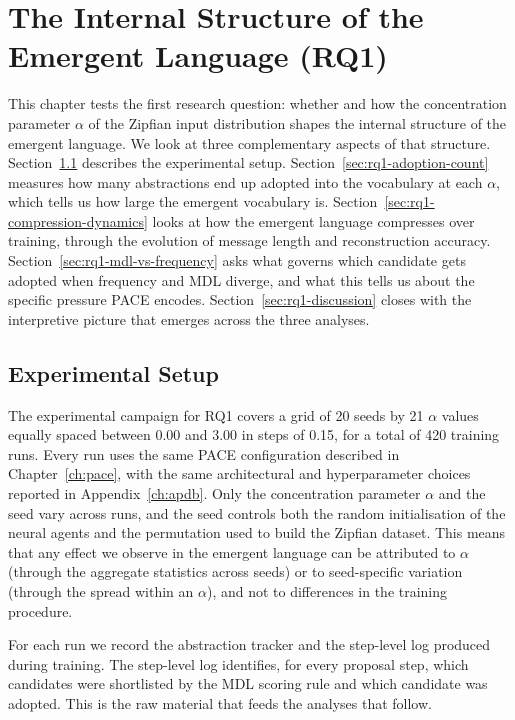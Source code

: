 \chapter{The Internal Structure of the Emergent Language (RQ1)}
\label{ch:experimental}

This chapter tests the first research question: whether and how the concentration parameter $\alpha$ of the Zipfian input distribution shapes the internal structure of the emergent language. We look at three complementary aspects of that structure. Section~\ref{sec:rq1-setup} describes the experimental setup. Section~\ref{sec:rq1-adoption-count} measures how many abstractions end up adopted into the vocabulary at each $\alpha$, which tells us how large the emergent vocabulary is. Section~\ref{sec:rq1-compression-dynamics} looks at how the emergent language compresses over training, through the evolution of message length and reconstruction accuracy. Section~\ref{sec:rq1-mdl-vs-frequency} asks what governs which candidate gets adopted when frequency and MDL diverge, and what this tells us about the specific pressure PACE encodes. Section~\ref{sec:rq1-discussion} closes with the interpretive picture that emerges across the three analyses.

\section{Experimental Setup}
\label{sec:rq1-setup}

The experimental campaign for RQ1 covers a grid of 20 seeds by 21 $\alpha$ values equally spaced between 0.00 and 3.00 in steps of 0.15, for a total of 420 training runs. Every run uses the same PACE configuration described in Chapter~\ref{ch:pace}, with the same architectural and hyperparameter choices reported in Appendix~\ref{ch:apdb}. Only the concentration parameter $\alpha$ and the seed vary across runs, and the seed controls both the random initialisation of the neural agents and the permutation used to build the Zipfian dataset. This means that any effect we observe in the emergent language can be attributed to $\alpha$ (through the aggregate statistics across seeds) or to seed-specific variation (through the spread within an $\alpha$), and not to differences in the training procedure.

For each run we record the abstraction tracker and the step-level log produced during training. The step-level log identifies, for every proposal step, which candidates were shortlisted by the MDL scoring rule and which candidate was adopted. This is the raw material that feeds the analyses that follow.

